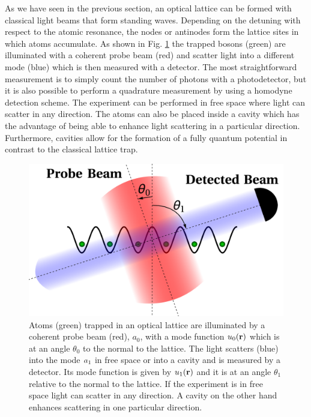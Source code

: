 
As we have seen in the previous section, an optical lattice can be
formed with classical light beams that form standing waves. Depending
on the detuning with respect to the atomic resonance, the nodes or
antinodes form the lattice sites in which atoms accumulate. As shown
in Fig. \ref{fig:LatticeDiagram} the trapped bosons (green) are
illuminated with a coherent probe beam (red) and scatter light into a
different mode (blue) which is then measured with a detector. The most
straightforward measurement is to simply count the number of photons
with a photodetector, but it is also possible to perform a quadrature
measurement by using a homodyne detection scheme. The experiment can
be performed in free space where light can scatter in any
direction. The atoms can also be placed inside a cavity which has the
advantage of being able to enhance light scattering in a particular
direction. Furthermore, cavities allow for the formation of a fully
quantum potential in contrast to the classical lattice trap.

\begin{figure}[htbp!]
  \centering
  \includegraphics[width=\linewidth]{LatticeDiagram}
  \caption[Experimental Setup]{Atoms (green) trapped in an optical
    lattice are illuminated by a coherent probe beam (red), $a_0$,
    with a mode function $u_0(\mathbf{r})$ which is at an angle $\theta_0$
    to the normal to the lattice. The light scatters (blue) into the
    mode $a_1$ in free space or into a cavity and is measured by a
    detector. Its mode function is given by $u_1(\mathbf{r})$ and it is at
    an angle $\theta_1$ relative to the normal to the lattice. If the
    experiment is in free space light can scatter in any direction. A
    cavity on the other hand enhances scattering in one particular
    direction.}
  \label{fig:LatticeDiagram}
\end{figure}

